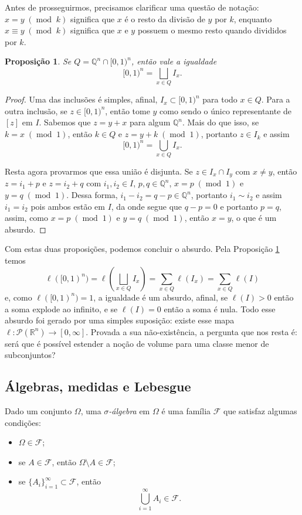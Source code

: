 \documentclass{article}
\newtheorem{proposition}[definition]{Proposição}
\DeclareMathOperator{\ArithmeticMod}{mod}
\newcommand{\modulus}[1]{\phantom{.}(\ArithmeticMod\phantom{.}#1)}
\begin{document}
Antes de prosseguirmos, precisamos clarificar uma questão de notação: $x = y \modulus{k}$ significa que $x$ é o resto da divisão de $y$ por $k$, enquanto $x \equiv y \modulus{k}$ significa que $x$ e $y$ possuem o mesmo resto quando divididos por $k$.

\begin{proposition}\label{prop3}
    Se $Q = \mathbb{Q}^n \cap [0,1)^n$, então vale a igualdade $$[0,1)^n = \bigsqcup_{x \in Q} I_x.$$
\end{proposition}
\begin{proof}
    Uma das inclusões é simples, afinal, $I_x \subset [0,1)^n$ para todo $x \in Q$. Para a outra inclusão, se $z \in [0,1)^n$, então tome $y$ como sendo o único representante de $[z]$ em $I$. Sabemos que $z = y + x$ para algum $\mathbb{Q}^n$. Mais do que isso, se $k = x \modulus{1}$, então $k \in Q$ e $z = y + k \modulus{1}$, portanto $z \in I_k$ e assim $$[0,1)^n = \bigcup_{x \in Q} I_x.$$
    
    Resta agora provarmos que essa união é disjunta. Se $z \in I_x \cap I_y$ com $x \neq y$, então $z = i_1 + p$ e $z = i_2 + q$ com $i_1, i_2 \in I$, $p, q \in \mathbb{Q}^n$, $x = p \modulus{1}$ e $y = q \modulus{1}$. Dessa forma, $i_1 - i_2 = q - p \in \mathbb{Q}^n$, portanto $i_1 \sim i_2$ e assim $i_1 = i_2$ pois ambos estão em $I$, da onde segue que $q - p = 0$ e portanto $p = q$, assim, como $x = p \modulus{1}$ e $y = q \modulus{1}$, então $x = y$, o que é um absurdo.
\end{proof}

Com estas duas proposições, podemos concluir o absurdo. Pela Proposição \ref{prop3} temos $$\ell([0,1)^n) = \ell\left(\bigsqcup_{x \in Q} I_x\right) = \sum_{x \in Q} \ell(I_x) = \sum_{x \in Q} \ell(I)$$ e, como $\ell([0,1)^n) = 1$, a igualdade é um absurdo, afinal, se $\ell(I) > 0$ então a soma explode ao infinito, e se $\ell(I) = 0$ então a soma é nula. Todo esse absurdo foi gerado por uma simples suposição: existe esse mapa $\ell \colon \mathcal{P}(\mathbb{R}^n) \to [0, \infty]$. Provada a sua não-existência, a pergunta que nos resta é: será que é possível estender a noção de volume para uma classe menor de subconjuntos?

\subsection{Álgebras, medidas e Lebesgue}

Dado um conjunto $\Omega$, uma \textit{$\sigma$-álgebra} em $\Omega$ é uma família $\mathcal{F}$ que satisfaz algumas condições: \begin{itemize}
    \item $\Omega \in \mathcal{F}$;
    \item se $A \in \mathcal{F}$, então $\Omega \setminus A \in \mathcal{F}$;
    \item se $\{A_i\}_{i = 1}^\infty \subset \mathcal{F}$, então $$\bigcup_{i = 1}^\infty A_i \in \mathcal{F}.$$
\end{itemize}
\end{document}
